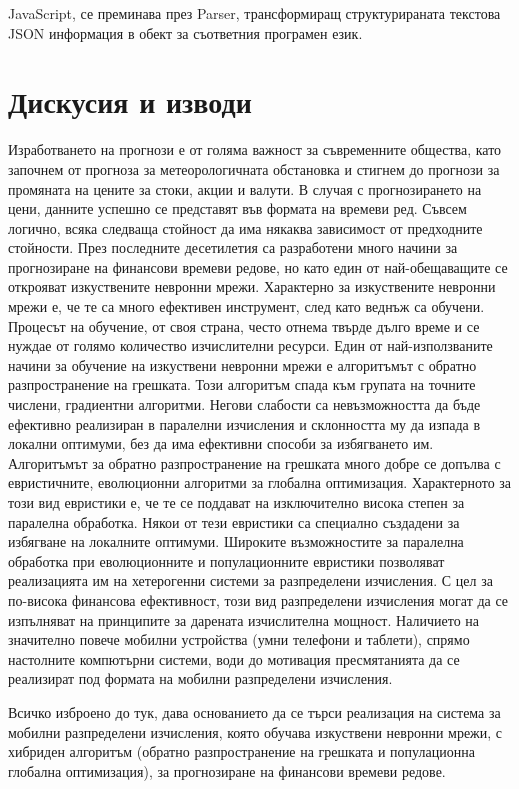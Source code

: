 JavaScript, се преминава през Parser, трансформиращ структурираната текстова JSON информация в обект за съответния програмен език. 

\section{Дискусия и изводи}

Изработването на прогнози е от голяма важност за съвременните общества, като започнем от прогноза за метеорологичната обстановка и стигнем до прогнози за промяната на цените за стоки, акции и валути. В случая с прогнозирането на цени, данните успешно се представят във формата на времеви ред. Съвсем логично, всяка следваща стойност да има някаква зависимост от предходните стойности. През последните десетилетия са разработени много начини за прогнозиране на финансови времеви редове, но като един от най-обещаващите се открояват изкуствените невронни мрежи. Характерно за изкуствените невронни мрежи е, че те са много ефективен инструмент, след като веднъж са обучени. Процесът на обучение, от своя страна, често отнема твърде дълго време и се нуждае от голямо количество изчислителни ресурси. Един от най-използваните начини за обучение на изкуствени невронни мрежи е алгоритъмът с обратно разпространение на грешката. Този алгоритъм спада към групата на точните числени, градиентни алгоритми. Негови слабости са невъзможността да бъде ефективно реализиран в паралелни изчисления и склонността му да изпада в локални оптимуми, без да има ефективни способи за избягването им. Алгоритъмът за обратно разпространение на грешката много добре се допълва с евристичните, еволюционни алгоритми за глобална оптимизация. Характерното за този вид евристики е, че те се поддават на изключително висока степен за паралелна обработка. Някои от тези евристики са специално създадени за избягване на локалните оптимуми. Широките възможностите за паралелна обработка при еволюционните и популационните евристики позволяват реализацията им на хетерогенни системи за разпределени изчисления. С цел за по-висока финансова ефективност, този вид разпределени изчисления могат да се изпълняват на принципите за дарената изчислителна мощност. Наличието на значително повече мобилни устройства (умни телефони и таблети), спрямо настолните компютърни системи, води до мотивация пресмятанията да се реализират под формата на мобилни разпределени изчисления.

Всичко изброено до тук, дава основанието да се търси реализация на система за мобилни разпределени изчисления, която обучава изкуствени невронни мрежи, с хибриден алгоритъм (обратно разпространение на грешката и популационна глобална оптимизация), за прогнозиране на финансови времеви редове.

